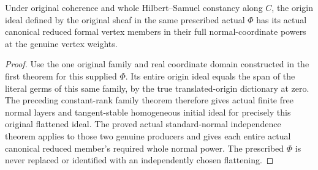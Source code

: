\begin{theorem}
\label{hir:actual-supplied-flattening-canonical-normal-powers}
\leanok
Under original coherence and whole Hilbert--Samuel constancy along $C$, the origin ideal defined by the original sheaf in the same prescribed actual $\Phi$ has its actual canonical reduced formal vertex members in their full normal-coordinate powers at the genuine vertex weights.
\end{theorem}
\begin{proof}
Use the one original family and real coordinate domain constructed in the first theorem for this supplied $\Phi$. Its entire origin ideal equals the span of the literal germs of this same family, by the true translated-origin dictionary at zero. The preceding constant-rank family theorem therefore gives actual finite free normal layers and tangent-stable homogeneous initial ideal for precisely this original flattened ideal. The proved actual standard-normal independence theorem applies to those two genuine producers and gives each entire actual canonical reduced member's required whole normal power. The prescribed $\Phi$ is never replaced or identified with an independently chosen flattening.
\end{proof}

